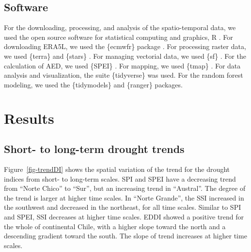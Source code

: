 \documentclass[
  authoryear,
  preprint,
  3p,
  onecolumn]{elsarticle}
\begin{document}
\hypertarget{software}{%
\subsection{Software}\label{software}}

For the downloading, processing, and analysis of the spatio-temporal
data, we used the open source software for statistical computing and
graphics, R \citep{R2023}. For downloading ERA5L, we used the \{ecmwfr\}
package \citep{Hufkens2019}. For processing raster data, we used
\{terra\} \citep{Hijmans2023} and \{stars\} \citep{Pebesma2023}. For
managing vectorial data, we used \{sf\} \citep{Pebesma2018}. For the
calculation of AED, we used \{SPEI\} \citep{Bergueria2023}. For mapping,
we used \{tmap\} \citep{Tennekes2018}. For data analysis and
visualization, the suite \{tidyverse\} \citep{Wickham2019} was used. For
the random forest modeling, we used the \{tidymodels\} \citep{Kuhn2020}
and \{ranger\} \citep{Wright2017} packages.

\hypertarget{results}{%
\section{Results}\label{results}}

\hypertarget{short--to-long-term-drought-trends-1}{%
\subsection{Short- to long-term drought
trends}\label{short--to-long-term-drought-trends-1}}

Figure~\ref{fig-trendDI} shows the spatial variation of the trend for
the drought indices from short- to long-term scales. SPI and SPEI have a
decreasing trend from ``Norte Chico'' to ``Sur'', but an increasing
trend in ``Austral''. The degree of the trend is larger at higher time
scales. In ``Norte Grande'', the SSI increased in the southwest and
decreased in the northeast, for all time scales. Similar to SPI and
SPEI, SSI decreases at higher time scales. EDDI showed a positive trend
for the whole of continental Chile, with a higher slope toward the north
and a descending gradient toward the south. The slope of trend increases
at higher time scales.

\blandscape
\end{document}
